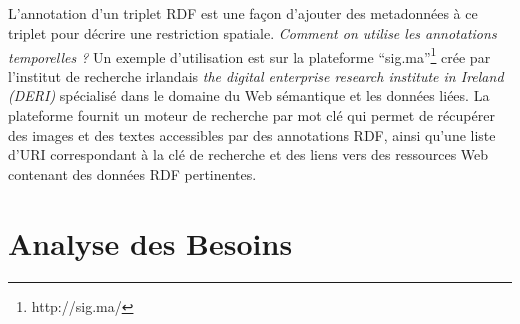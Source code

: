 \subparagraph{}
L'annotation d'un triplet RDF est une façon d'ajouter des metadonnées à ce triplet pour décrire une restriction spatiale.
\newline
\textit{Comment on utilise les annotations temporelles ?} Un exemple d'utilisation est sur la plateforme ``sig.ma''\footnote{http://sig.ma/} crée par l'institut de recherche irlandais \textit{the digital enterprise research institute in Ireland (DERI)} spécialisé dans le domaine du Web sémantique et les données liées. La plateforme fournit un moteur de recherche par mot clé qui permet de récupérer des images et des textes accessibles par des annotations RDF, ainsi qu'une liste d'URI correspondant à la clé de recherche et des liens vers des ressources Web contenant des données RDF pertinentes.
\section{Analyse des Besoins}
